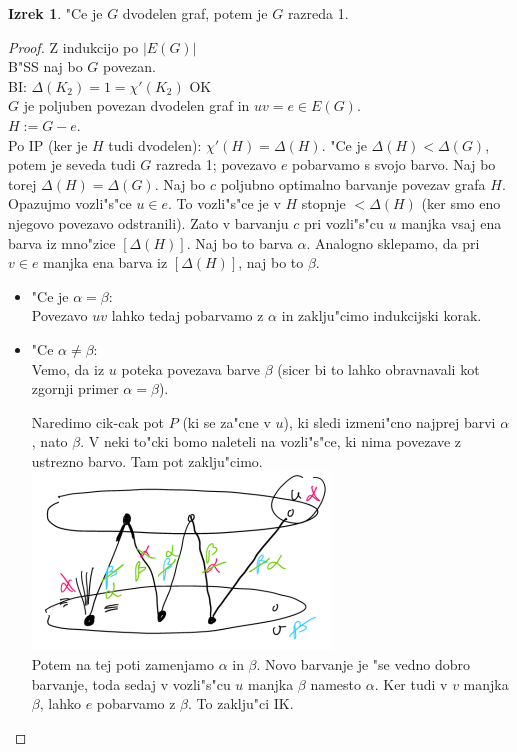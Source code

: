 \documentclass{article}
\theoremstyle{definition}
\newtheorem{theorem}{Izrek}[section]
\begin{document}
	\begin{theorem}
		"Ce je $G$ dvodelen graf, potem je $G$ razreda 1.
		\begin{proof} Z indukcijo po $|E(G)|$ \\
			B"SS naj bo $G$ povezan.\\
			BI: $\Delta(K_2) = 1 = \chi'(K_2)$ OK \\
			$G$ je poljuben povezan dvodelen graf in $uv = e \in E(G)$. \\
			$H := G-e$. \\
			Po IP (ker je $H$ tudi dvodelen): $\chi'(H) = \Delta(H)$. "Ce je $\Delta(H) < \Delta(G)$, potem je seveda tudi $G$ razreda 1; povezavo $e$ pobarvamo s svojo barvo. 
			Naj bo torej $\Delta(H) = \Delta(G)$. Naj bo $c$ poljubno optimalno barvanje povezav grafa $H$. Opazujmo vozli"s"ce $u \in e$.
			To vozli"s"ce je v $H$ stopnje $< \Delta(H)$ (ker smo eno njegovo povezavo odstranili).
			Zato v barvanju $c$ pri vozli"s"cu $u$ manjka vsaj ena barva iz mno"zice $[\Delta(H)]$. Naj bo to barva $\alpha$.
			Analogno sklepamo, da pri $v \in e$ manjka ena barva iz $[\Delta(H)]$, naj bo to $\beta$.
			\begin{itemize}
				\item "Ce je $\alpha = \beta$:\\
				Povezavo $uv$ lahko tedaj pobarvamo z $\alpha$ in zaklju"cimo indukcijski korak.
				
				\item "Ce $\alpha \neq \beta$:\\
				Vemo, da iz $u$ poteka povezava barve $\beta$ (sicer bi to lahko obravnavali kot zgornji primer $\alpha = \beta$).
				
				Naredimo cik-cak pot $P$ (ki se za"cne v $u$), ki sledi izmeni"cno najprej barvi $\alpha$, nato $\beta$. V neki to"cki bomo naleteli na vozli"s"ce, ki nima povezave z ustrezno barvo. Tam pot zaklju"cimo.
				\\ \includegraphics{cik-cak-dvodelni} \\
				Potem na tej poti zamenjamo $\alpha$ in $\beta$. Novo barvanje je "se vedno dobro barvanje, toda sedaj v vozli"s"cu $u$ manjka $\beta$ namesto $\alpha$. Ker tudi v $v$ manjka $\beta$, lahko $e$ pobarvamo z $\beta$. To zaklju"ci IK.
			\end{itemize}
		\end{proof}
	\end{theorem}

\end{document}
